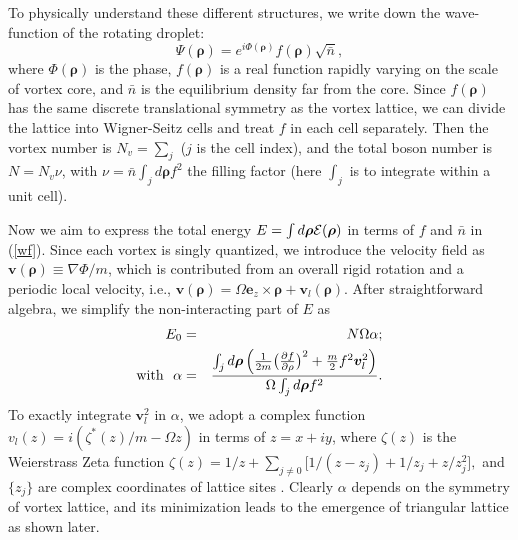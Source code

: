 \documentclass[reprint,aps,prl,twocolumn,superscriptaddress]{revtex4-1}
\begin{document}
To physically understand these different structures, we write down the wave-function of the rotating droplet:
\begin{equation} 
    \Psi(\bm{\rho})=e^{i \Phi(\bm{\rho})}f(\bm{\rho})\sqrt{\bar{n}}, \label{wf}
\end{equation}
where $\Phi(\bm{\rho})$ is the phase, $f(\bm{\rho})$ is a real function rapidly varying on the scale of vortex core, and $\bar{n}$ is the equilibrium density far from the core. Since $f(\bm{\rho})$ has the same discrete translational symmetry as the vortex lattice, we can divide the lattice into Wigner-Seitz cells and treat $f$ in each cell separately. Then the vortex number is $N_v=\sum_j$ ($j$ is the cell index), and the total boson number is $N= N_v \nu$, with $\nu=\bar{n} \int_j d\bm{\rho} f^2$  the filling factor (here $\int_j$ is to integrate within a unit cell).

Now we aim to  express the total energy $E=\int d\bm{\rho} \cal{E}(\bm{\rho})$  in terms of $f$ and $\bar{n}$ in (\ref{wf}).  Since each vortex is singly quantized, we introduce the velocity field as $\bm{v}(\bm{\rho})\equiv \nabla \Phi/m$, which is contributed from an overall rigid rotation and a periodic local velocity, i.e., $\bm{v}(\bm{\rho})=\Omega \bm{e}_z\times \bm{\rho} + \bm{v}_l(\bm{\rho})$\cite{Tkachenko1966}. After straightforward algebra, we simplify the non-interacting part of $E$ as
\begin{eqnarray}
E_0&=&N\Omega \alpha; \label{E0} \\
{\rm with} \ \    \alpha &=& \frac{ \int_j d\bm{\rho} \left( \frac{1}{2m}\big(\frac{\partial
     f}{\partial \rho}\big)^2 + \frac{m}{2} f^2 \bm{v}_l^2\right)}{ \Omega \int_j d\bm{\rho}f^2}. \nonumber
\end{eqnarray}
To exactly integrate  $\bm{v}_l^2$ in $\alpha$, we adopt a complex function $v_l(z) = i (\zeta^*(z)/m - \Omega z)$ in terms of $z=x+iy$, where $\zeta(z)$ is the Weierstrass Zeta function
$
    \zeta(z) = 1/{z} + \sum_{j\ne0}\big[{1/(z-z_j)} + 1/{z_j} + {z}/{z_j^2}\big],
$
and $\{z_j\}$ are complex coordinates of lattice sites \cite{Akhiezer1990:ElementsTheoryElliptic}. %
Clearly $\alpha$ depends on the symmetry of vortex lattice, and its minimization  leads to the emergence of triangular lattice as shown later.
\end{document}
